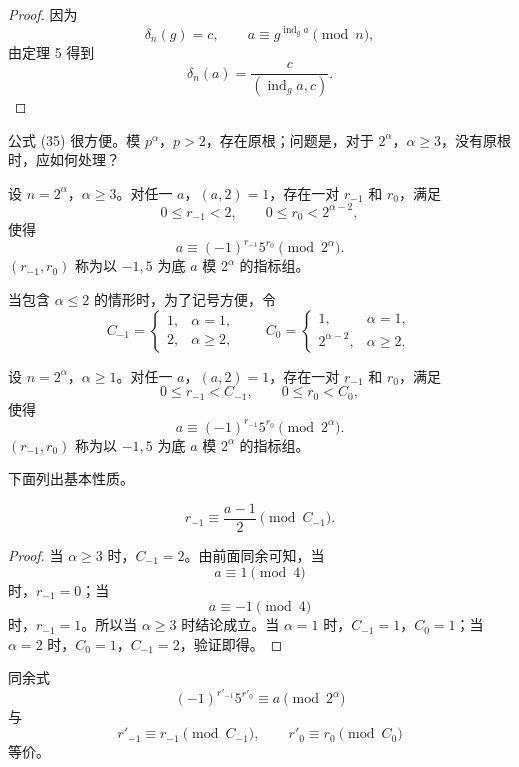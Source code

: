 \begin{proof}
	因为
	\[
		\delta_n(g)=c,
		\qquad
		a\equiv g^{\operatorname{ind}_g a}\pmod n,
	\]
	由定理 5 得到
	\[
		\delta_n(a)=\frac{c}{(\operatorname{ind}_g a,c)}.
	\]
\end{proof}

公式 (35) 很方便。模 $p^\alpha$，$p>2$，存在原根；问题是，对于 $2^\alpha$，$\alpha\geq 3$，没有原根时，应如何处理？

\begin{definition}[原文 定义 4]
	设 $n=2^\alpha$，$\alpha\geq 3$。对任一 $a$，$(a,2)=1$，存在一对 $r_{-1}$ 和 $r_0$，满足
	\[
		0\leq r_{-1}<2,\qquad 0\leq r_0<2^{\alpha-2},
	\]
	使得
	\[
		a\equiv (-1)^{r_{-1}}5^{r_0}\pmod {2^\alpha}.
	\]
	$(r_{-1},r_0)$ 称为以 $-1,5$ 为底 $a$ 模 $2^\alpha$ 的指标组。
\end{definition}

当包含 $\alpha\leq 2$ 的情形时，为了记号方便，令
\[
	C_{-1}=
	\begin{cases}
		1, & \alpha=1,\\
		2, & \alpha\geq 2,
	\end{cases}
	\qquad
	C_0=
	\begin{cases}
		1, & \alpha=1,\\
		2^{\alpha-2}, & \alpha\geq 2.
	\end{cases}
\]

\begin{definition}[原文 定义 5]
	设 $n=2^\alpha$，$\alpha\geq 1$。对任一 $a$，$(a,2)=1$，存在一对 $r_{-1}$ 和 $r_0$，满足
	\[
		0\leq r_{-1}<C_{-1},
		\qquad
		0\leq r_0<C_0,
	\]
	使得
	\[
		a\equiv (-1)^{r_{-1}}5^{r_0}\pmod {2^\alpha}.
	\]
	$(r_{-1},r_0)$ 称为以 $-1,5$ 为底 $a$ 模 $2^\alpha$ 的指标组。
\end{definition}

下面列出基本性质。

\begin{theorem}[原文 定理 21]
	\[
		r_{-1}\equiv \frac{a-1}{2}\pmod {C_{-1}}.
	\]
\end{theorem}

\begin{proof}
	当 $\alpha\geq 3$ 时，$C_{-1}=2$。由前面同余可知，当
	\[
		a\equiv 1\pmod 4
	\]
	时，$r_{-1}=0$；当
	\[
		a\equiv -1\pmod 4
	\]
	时，$r_{-1}=1$。所以当 $\alpha\geq 3$ 时结论成立。当 $\alpha=1$ 时，$C_{-1}=1$，$C_0=1$；当 $\alpha=2$ 时，$C_0=1$，$C_{-1}=2$，验证即得。
\end{proof}

\begin{theorem}[原文 定理 22]
	同余式
	\[
		(-1)^{r'_{-1}}5^{r'_0}\equiv a\pmod {2^\alpha}
	\]
	与
	\[
		r'_{-1}\equiv r_{-1}\pmod {C_{-1}},
		\qquad
		r'_0\equiv r_0\pmod {C_0}
	\]
	等价。
\end{theorem}

